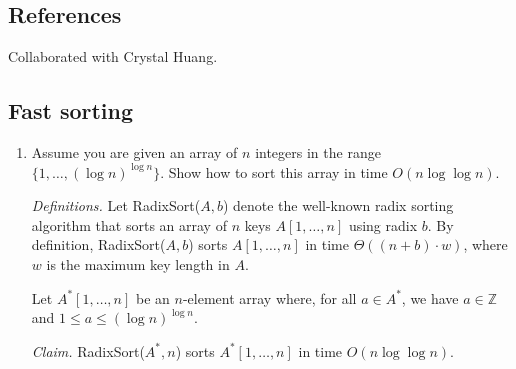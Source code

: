 \def\lc{\left\lceil}   
\def\rc{\right\rceil}
\runningheadrule
\firstpageheadrule
\cfoot{}
\subsection*{References}
Collaborated with Crystal Huang.

\subsection{Fast sorting}

\begin{enumerate}
    \item Assume you are given an array of $n$ integers in the range
    $\{1,\ldots, (\log n)^{\log n}\}$. Show how to sort this array in time
    $O(n\log\log n)$.

\begin{solution}
\textit{Definitions. }Let {\sc RadixSort}($A,b$) denote the well-known radix sorting algorithm that sorts an array of $n$ keys $A[1,\dots,n]$ using radix $b$. By definition, {\sc RadixSort}($A,b$) sorts $A[1,\dots,n]$ in time $\Theta((n+b)\cdot w)$, where $w$ is the maximum key length in $A$.

Let $A^*[1,\dots,n]$  be an $n$-element array where, for all $a\in A^*$, we have $a\in\mathbb{Z}$ and $1\leq a\leq(\log n)^{\log n}$. 

\textit{Claim. }{\sc RadixSort}($A^*,n$) sorts $A^*[1,\dots,n]$ in time $O(n\log\log n)$.


\end{solution}
\end{enumerate}
